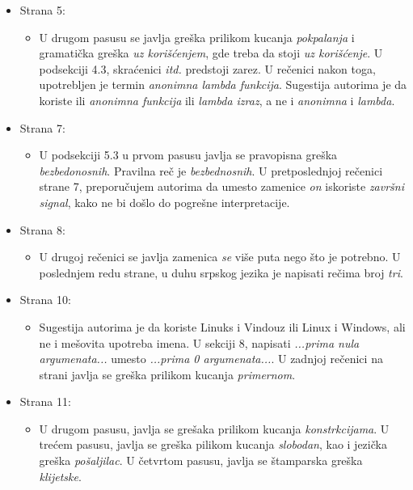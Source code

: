 \documentclass[a4paper]{report}
\begin{document}
\begin{itemize}
\begin{itemize}
    \end{itemize}
    \item Strana 5:
    \begin{itemize}
        \item U drugom pasusu se javlja greška prilikom kucanja \textit{pokpalanja} i gramatička greška \textit{uz korišćenjem}, gde treba da stoji \textit{uz korišćenje}. U podsekciji 4.3, skraćenici \textit{itd.} predstoji zarez. U rečenici nakon toga, upotrebljen je termin \textit{anonimna lambda funkcija}. Sugestija autorima je da koriste ili \textit{anonimna funkcija} ili \textit{lambda izraz}, a ne i \textit{anonimna} i \textit{lambda}. 
    \end{itemize}
    \item Strana 7:
    \begin{itemize}
        \item U podsekciji 5.3 u prvom pasusu javlja se pravopisna greška \textit{bezbedonosnih}. Pravilna reč je \textit{bezbednosnih}. U pretposlednjoj rečenici strane 7, preporučujem autorima da umesto zamenice \textit{on} iskoriste \textit{završni signal}, kako ne bi došlo do pogrešne interpretacije.
    \end{itemize}
    \item Strana 8:
    \begin{itemize}
        \item U drugoj rečenici se javlja zamenica \textit{se} više puta nego što je potrebno. U poslednjem redu strane, u duhu srpskog jezika je napisati rečima broj \textit{tri}.
    \end{itemize}
    \item Strana 10:
    \begin{itemize}
        \item Sugestija autorima je da koriste Linuks i Vindouz ili Linux i Windows, ali ne i mešovita upotreba imena.
        U sekciji 8, napisati \textit{...prima nula argumenata...} umesto \textit{...prima 0 argumenata...}. U zadnjoj rečenici na strani javlja se greška prilikom kucanja \textit{primernom}.
    \end{itemize}
    \item Strana 11:
    \begin{itemize}
        \item U drugom pasusu, javlja se grešaka prilikom kucanja \textit{konstrkcijama}. U trećem pasusu, javlja se greška pilikom kucanja \textit{slobodan}, kao i jezička greška \textit{pošaljilac}. U četvrtom pasusu, javlja se štamparska greška \textit{klijetske}.
    \end{itemize}
\end{itemize}
\end{document}
